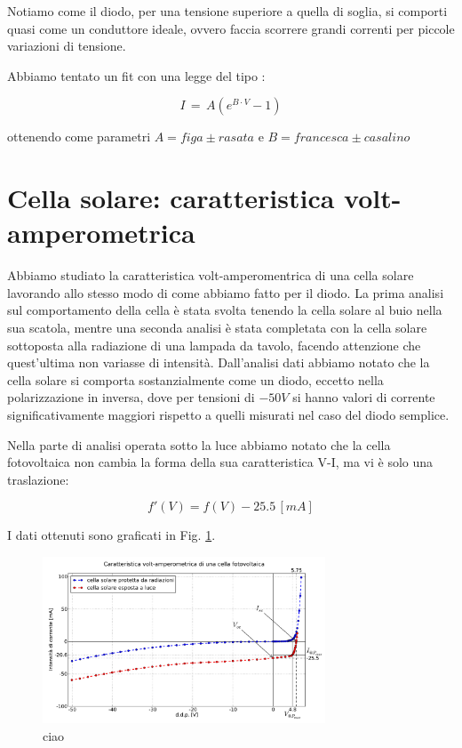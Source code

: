 Notiamo come il diodo, per una tensione superiore a quella di soglia, si comporti quasi come un conduttore ideale, ovvero faccia scorrere grandi correnti per piccole variazioni di tensione. 

Abbiamo tentato un fit con una legge del tipo : 

\begin{equation}
I \, = \, A \left( e^{B \cdot V} -1 \right)
\label{eq:diodefit}
\end{equation}

ottenendo come parametri $A= figa \pm rasata$ e $B= francesca \pm casalino$

\section{Cella solare: caratteristica volt-amperometrica}

Abbiamo studiato la caratteristica volt-amperomentrica di una cella solare lavorando allo stesso modo di come abbiamo fatto per il diodo.
La prima analisi sul comportamento della cella è stata svolta tenendo la cella solare al buio nella sua scatola, mentre una seconda analisi è stata completata con la cella solare sottoposta alla radiazione di una lampada da tavolo, facendo attenzione che quest'ultima non variasse di intensità.
Dall'analisi dati abbiamo notato che la cella solare si comporta sostanzialmente come un diodo, eccetto nella polarizzazione in inversa, dove per tensioni di $-50V$ si hanno valori di corrente significativamente maggiori rispetto a quelli misurati nel caso del diodo semplice. 

Nella parte di analisi operata sotto la luce abbiamo notato che la cella fotovoltaica non cambia la forma della sua caratteristica V-I, ma vi è solo una traslazione: 

$$f'(V)=f(V)-25.5 \, [mA]$$ %
 

I dati ottenuti sono graficati in Fig. \ref{fig:cella}.

\begin{figure}[h]
\center
	\includegraphics[width=0.75\textwidth]{cella.pdf}
	\caption{ciao}
	\label{fig:cella}
\end{figure}

